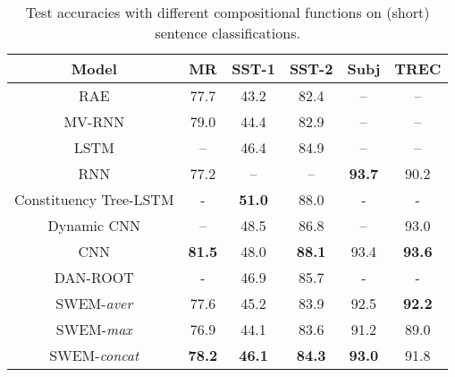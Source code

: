 \documentclass[11pt,a4paper]{article}
\begin{document}
\begin{table*}[!ht] \vspace{-2mm}
	\centering
\def\arraystretch{1.0}
	\begin{small}
		\begin{tabular}{c||c|c|c|c|c}
\toprule[1.2pt]
			\textbf{Model} &  \textbf{MR} & \textbf{SST-1} & \textbf{SST-2} &  	\textbf{Subj} &  	\textbf{TREC} \\
			\hline
			RAE \cite{socher2011semi}      & 77.7 & 43.2 & 82.4 & -- & --    \\
			MV-RNN \cite{socher2012semantic}  & 79.0 & 44.4& 82.9 & -- & --  \\
			LSTM \cite{tai2015improved}   & -- & 46.4 & 84.9 & -- & --   \\
			RNN \cite{zhao2015self}   & 77.2 & -- & -- & \bf{93.7} & 90.2    \\
			Constituency Tree-LSTM \cite{tai2015improved}   & - & \bf{51.0} & 88.0 & - & -   \\
			Dynamic CNN \cite{kalchbrenner2014convolutional}  & -- & 48.5 & 86.8 & -- & 93.0  \\
			CNN \cite{kim2014convolutional}     & \bf{81.5} & 48.0 & \bf{88.1} & 93.4 & \bf{93.6}   \\
			DAN-ROOT \cite{iyyer2015deep}   & - & 46.9 & 85.7 & - & -   \\
			\hline
			SWEM-\emph{aver}          & 77.6 &45.2 & 83.9 & 92.5 & \bf{92.2}  \\
			SWEM-\emph{max}         & 76.9 &44.1 & 83.6 & 91.2 & 89.0 \\
			SWEM-\emph{concat}         & \bf{78.2} &\bf{46.1} & \bf{84.3} & \bf{93.0} & 91.8 \\
\bottomrule[1.2pt]
		\end{tabular}
	\end{small}
	\vspace{-2mm}
	\caption{Test accuracies with different compositional functions on (short) sentence classifications.}
	\label{tab:sentence}
	\vspace{-2mm}
\end{table*}
\end{document}
